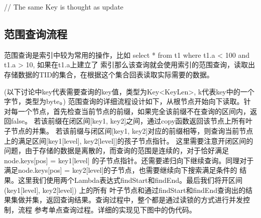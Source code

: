 \begin{breakablealgorithm}
\begin{algorithmic}[1]
\begin{footnotesize}
                \STATE // The same Key is thought as update
                \RETURN {}
            \ENDIF

            \ENDIF
        \ENDIF
        
    \ENDWHILE
    \end{footnotesize}
    \end{algorithmic}
\end{breakablealgorithm}

\subsection{范围查询流程}
范围查询是索引中较为常用的操作，比如 select * from t1 where t1.a < 100 and t1.a > 10, 如果在t1.a上建立了
索引那么该查询就会使用索引的范围查询，读取出存储数据的TID的集合，在根据这个集合回表读取实际需要的数据。

(以下讨论中key代表需要查询的key值，类型为Key<KeyLen>, k代表key中的一个字节，类型为byte。)
范围查询的详细流程设计如下，从根节点开始向下读取。针对每一个节点，首先检查当前节点的前缀，如果完全该前缀不在查询的区间内，返回false。
若该前缀在闭区间[key1, key2]之间，通过copy函数返回该节点上所有叶子节点的并集。
若该前缀与闭区间[key1, key2]对应的前缀相等，则查询当前节点上的满足区间[key1[level], key2[level]]的孩子节点指针。
这里需要注意开闭区间的问题，由于存储的数据是离散的，而查询的范围是连续的，对于恰好满足node.keys[pos] = key1[level]
的子节点指针。还需要递归向下继续查询。同理对于满足node.keys[pos] = key2[level]的子节点，也需要继续向下搜索满足条件的
结果。这里我们使用两个Lambda表达式findStart和findEnd。最后我们将开区间 (key1[level], key2[level]) 上的所有
叶子节点和通过findStart和findEnd查询出的结果集做并集，返回查询结果。查询过程中，整个都是通过读锁的方式进行并发控制，流程
参考单点查询过程。详细的实现见下图中的伪代码。

